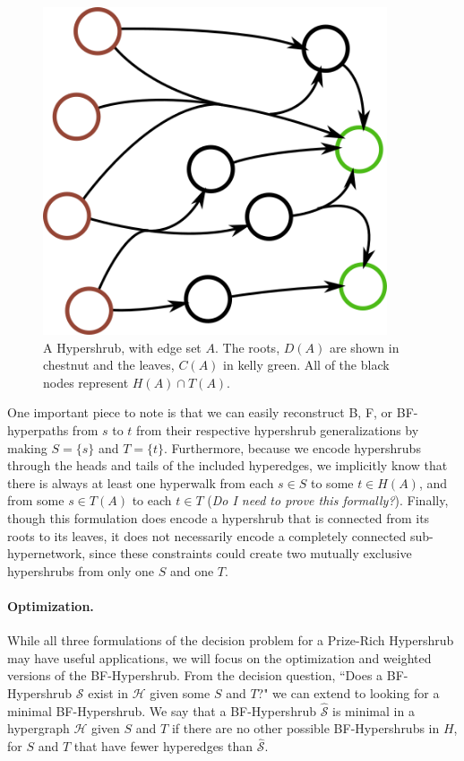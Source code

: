 \documentclass[12pt,twoside]{reedthesis}
\theoremstyle{definition}
\begin{document}
\begin{figure}[!h]
  \begin{center}
    \includegraphics[width=4in]{BF-hypershrub}
  \caption[Hypershrub.]{A Hypershrub, with edge set $A$. The roots, $D(A)$ are shown in chestnut and the leaves, $C(A)$ in kelly green. All of the black nodes represent $H(A) \cap T(A)$.}
  \label{fig:BF-hypershrub}
  \end{center}
\end{figure}

One important piece to note is that we can easily reconstruct B, F, or BF-hyperpaths from $s$ to $t$ from their respective hypershrub generalizations by making $S=\{s\}$ and $T=\{t\}$. Furthermore, because we encode hypershrubs through the heads and tails of the included hyperedges, we implicitly know that there is always at least one hyperwalk from each $s \in S$ to some $t \in H(A)$, and from some $s \in T(A)$ to each $t \in T$ (\emph{Do I need to prove this formally?}). Finally, though this formulation does encode a hypershrub that is connected from its roots to its leaves, it does not necessarily encode a completely connected sub-hypernetwork, since these constraints could create two mutually exclusive hypershrubs from only one $S$ and one $T$.

\paragraph{Optimization.}While all three formulations of the decision problem for a Prize-Rich Hypershrub may have useful applications, we will focus on the optimization and weighted versions of the BF-Hypershrub. From the decision question, ``Does a BF-Hypershrub $\mathcal{S}$ exist in $\mathcal{H}$ given some $S$ and $T$?" we can extend to looking for a minimal BF-Hypershrub. We say that a BF-Hypershrub $\hat{\mathcal{S}}$ is minimal in a hypergraph $\mathcal{H}$ given $S$ and $T$ if there are no other possible BF-Hypershrubs in $H$, for $S$ and $T$ that have fewer hyperedges than $\hat{\mathcal{S}}$.\par
\end{document}
